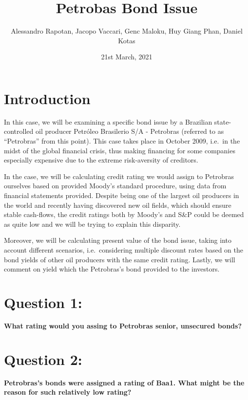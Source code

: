 \documentclass[
]{article}
\title{Petrobas Bond Issue}
\author{Alessandro Rapotan, Jacopo Vaccari, Genc Maloku, Huy Giang Phan,
Daniel Kotas}
\date{21st March, 2021}
\begin{document}
\maketitle

{
\setcounter{tocdepth}{2}
\tableofcontents
}
\hypertarget{introduction}{%
\section{Introduction}\label{introduction}}

In this case, we will be examining a specific bond issue by a Brazilian
state-controlled oil producer Petróleo Brasilerio S/A - Petrobras
(referred to as ``Petrobras'' from this point). This case takes place in
October 2009, i.e.~in the midst of the global financial crisis, thus
making financing for some companies especially expensive due to the
extreme risk-aversity of creditors.

In the case, we will be calculating credit rating we would assign to
Petrobras ourselves based on provided Moody's standard procedure, using
data from financial statements provided. Despite being one of the
largest oil producers in the world and recently having discovered new
oil fields, which should ensure stable cash-flows, the credit ratings
both by Moody's and S\&P could be deemed as quite low and we will be
trying to explain this disparity.

Moreover, we will be calculating present value of the bond issue, taking
into account different scenarios, i.e.~considering multiple discount
rates based on the bond yields of other oil producers with the same
credit rating. Lastly, we will comment on yield which the Petrobras's
bond provided to the investors.

\hypertarget{question-1}{%
\section{Question 1:}\label{question-1}}

\textbf{What rating would you assing to Petrobras senior, unsecured
bonds?}

\hypertarget{question-2}{%
\section{Question 2:}\label{question-2}}

\textbf{Petrobras's bonds were assigned a rating of Baa1. What might be
the reason for such relatively low rating?}
\end{document}

